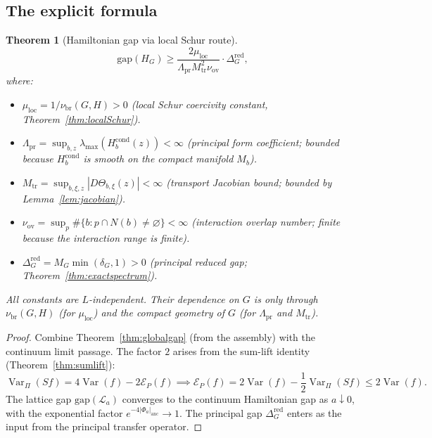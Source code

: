 \documentclass[12pt]{article}
\theoremstyle{plain}
\newtheorem{theorem}{Theorem}[section]
\theoremstyle{definition}
\numberwithin{equation}{section}
\newcommand{\Var}{\operatorname{Var}}
\newcommand{\pr}{\mathrm{pr}}
\newcommand{\loc}{\mathrm{loc}}
\newcommand{\red}{\mathrm{red}}
\newcommand{\br}{\mathrm{br}}
\newcommand{\ov}{\mathrm{ov}}
\newcommand{\tr}{\mathrm{tr}}
\begin{document}
\subsection{The explicit formula}

\begin{theorem}[Hamiltonian gap via local Schur route]\label{thm:explicitgap}
\begin{equation}
\boxed{\mathrm{gap}(H_G) \geq \frac{2\mu_{\loc}}{\Lambda_{\pr}M_{\tr}^2\nu_{\ov}}\cdot\Delta_G^{\red},}
\end{equation}
where:
\begin{itemize}
\item $\mu_{\loc}=1/\nu_{\br}(G,H)>0$ (local Schur coercivity constant, Theorem~\ref{thm:localSchur}).
\item $\Lambda_{\pr}=\sup_{b,z}\lambda_{\max}(H_b^{\mathrm{cond}}(z))<\infty$ (principal form coefficient; bounded because $H_b^{\mathrm{cond}}$ is smooth on the compact manifold $M_b$).
\item $M_{\tr}=\sup_{b,\xi,z}|D\Theta_{b,\xi}(z)|<\infty$ (transport Jacobian bound; bounded by Lemma~\ref{lem:jacobian}).
\item $\nu_{\ov}=\sup_p\#\{b:p\cap N(b)\neq\varnothing\}<\infty$ (interaction overlap number; finite because the interaction range is finite).
\item $\Delta_G^{\red}=M_G\min(\delta_G,1)>0$ (principal reduced gap; Theorem~\ref{thm:exactspectrum}).
\end{itemize}
All constants are $L$-independent.  Their dependence on $G$ is only through $\nu_{\br}(G,H)$ (for $\mu_{\loc}$) and the compact geometry of $G$ (for $\Lambda_{\pr}$ and $M_{\tr}$).
\end{theorem}

\begin{proof}
Combine Theorem~\ref{thm:globalgap} (from the assembly) with the continuum limit passage.  The factor $2$ arises from the sum-lift identity (Theorem~\ref{thm:sumlift}):
\begin{equation}
\Var_\Pi(Sf) = 4\Var(f)-2\mathcal{E}_P(f) \implies \mathcal{E}_P(f) = 2\Var(f)-\frac{1}{2}\Var_\Pi(Sf) \leq 2\Var(f).
\end{equation}
The lattice gap $\mathrm{gap}(\mathcal{L}_a)$ converges to the continuum Hamiltonian gap as $a\downarrow 0$, with the exponential factor $e^{-4|\Phi_a|_{\mathrm{anc}}}\to 1$.  The principal gap $\Delta_G^{\red}$ enters as the input from the principal transfer operator.
\end{proof}
\end{document}
